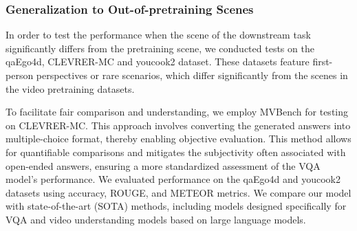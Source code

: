\subsubsection{Generalization to Out-of-pretraining Scenes}
In order to test the performance when the scene of the downstream task significantly differs from the pretraining scene, we conducted tests on the qaEgo4d, CLEVRER-MC and youcook2 dataset. These datasets feature first-person perspectives or rare scenarios, which differ significantly from the scenes in the video pretraining datasets.
\begin{table}[t]
\begin{center}
\caption{Accuracy on the CLEVRER-MC Dataset. MD, MC, MA, OE represents "Moving Direction", "Moving Count", "Moving Attribute" and "Object Existence", respectively. Best performance is highlighted in bold.}
\label{table:Clr}
\end{center}
\end{table}

To facilitate fair comparison and understanding, we employ MVBench \cite{li2023mvbench} for testing on CLEVRER-MC. This approach involves converting the generated answers into multiple-choice format, thereby enabling objective evaluation. This method allows for quantifiable comparisons and mitigates the subjectivity often associated with open-ended answers, ensuring a more standardized assessment of the VQA model's performance. We evaluated performance on the qaEgo4d and youcook2 datasets using accuracy, ROUGE, and METEOR metrics. We compare our model with state-of-the-art
(SOTA) methods, including models designed specifically for VQA and video understanding models based on large language models.

